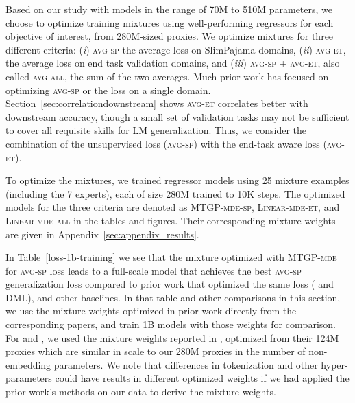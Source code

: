 Based on our study with models in the range of 70M to 510M parameters, we choose to optimize training mixtures using well-performing regressors for each objective of interest, from 280M-sized proxies. We optimize mixtures for three different criteria: (\textit{i}) \textsc{avg-sp} the average loss on SlimPajama domains, (\textit{ii}) \textsc{avg-et}, the average loss on  end task validation domains, and (\textit{iii}) \textsc{avg-sp} + \textsc{avg-et}, also called \textsc{avg-all}, the sum of the two averages. Much prior work has focused on optimizing \textsc{avg-sp} or the loss on a single domain. Section~\ref{sec:correlationdownstream} shows \textsc{avg-et} correlates better with downstream accuracy, though a small set of validation tasks may not be sufficient to cover all requisite skills for LM generalization. Thus, we consider the combination of the unsupervised loss (\textsc{avg-sp}) with the end-task aware loss (\textsc{avg-et}).

To optimize the mixtures, we trained regressor models using 25 mixture examples (including the 7 experts), each of size 280M trained to 10K steps. The optimized models for the three criteria are denoted as \textsc{MTGP-mde-sp}, \textsc{Linear-mde-et}, and \textsc{Linear-mde-all} in the tables and figures. Their corresponding mixture weights are given in Appendix~\ref{sec:appendix_results}.




In Table~\ref{loss-1b-training} we see that the mixture optimized with MTGP-\textsc{mde} for \textsc{avg-sp} loss leads to a full-scale model that achieves the best \textsc{avg-sp} generalization loss compared to prior work that optimized the same loss ({\doge} and DML), and other baselines. In that table and other comparisons in this section, we use the mixture weights optimized in prior work directly from the corresponding papers, and train 1B models with those weights for comparison.  For {\doge} and {\doremi}, we used the mixture weights reported in \citet{DOGE}, optimized from their 124M proxies which are similar in scale to our 280M proxies in the number of non-embedding parameters. We note that differences in tokenization and other hyper-parameters could have results in different optimized weights if we had applied the prior work's methods on our data to derive the mixture weights.

